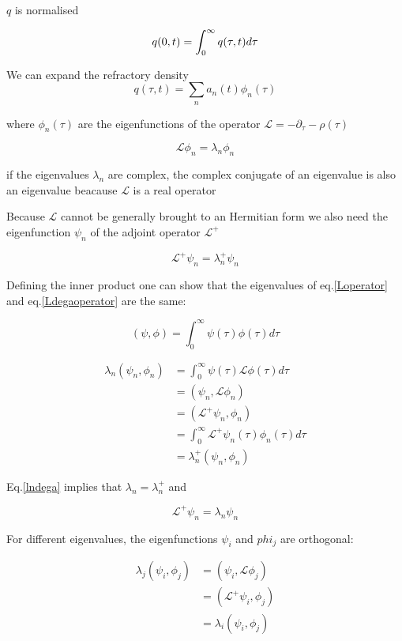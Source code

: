 \documentclass[a4paper,12pt,twoside]{article}
\def \be {\begin{equation}}
\def \ee {\end{equation}}
\begin{document}
$q$ is normalised 

\be
\label{nomalisation}
q(0,t)=\int_{0}^{\infty}q(\tau,t)d\tau \\
\ee


We can expand the refractory density
\be
\label{refractoryexpansion}
q(\tau,t)=\sum_n a_n(t)\phi_n(\tau)
\ee

where $\phi_n(\tau)$ are the eigenfunctions of the operator $\mathcal{L}=-\partial_{\tau}-\rho(\tau)$


\be
\label{Loperator}
\mathcal{L}\phi_n=\lambda_n\phi_n
\ee

if the eigenvalues $\lambda_n$ are complex, the complex conjugate of an eigenvalue is also an eigenvalue beacause $\mathcal{L}$ is a real operator

Because $\mathcal{L}$ cannot be generally brought to an Hermitian form we also need  the eigenfunction $\psi_n$ of the adjoint operator  $\mathcal{L}^{+}$

\be
\label{Ldegaoperator}
\mathcal{L}^+\psi_n=\lambda_n^+\psi_n
\ee

Defining the inner product one can show that the eigenvalues of eq.\eqref{Loperator} and eq.\eqref{Ldegaoperator} are the same:

\be
(\psi,\phi)=\int_{0}^{\infty}\psi(\tau)\phi(\tau)d\tau
\ee

\begin{align}
\lambda_n(\psi_n,\phi_n) &=\int_{0}^{\infty}\psi(\tau)\mathcal{L}\phi(\tau)d\tau  \nonumber \\
&=(\psi_n,\mathcal{L}\phi_n)  \nonumber \\
&=(\mathcal{L}^+\psi_n,\phi_n)  \nonumber \\
&=\int_{0}^{\infty}\mathcal{L}^+\psi_n(\tau)\phi_n(\tau)d\tau  \nonumber \\
&=\lambda_n^+(\psi_n,\phi_n) \label{lndega}
\end{align}

Eq.\eqref{lndega} implies that $\lambda_n=\lambda_n^+$ and
	
\be
\label{Ldegaoperator2}
\mathcal{L}^+\psi_n=\lambda_n\psi_n
\ee

For different eigenvalues, the eigenfunctions $\psi_i$ and $phi_j$ are orthogonal:

\begin{align}
\lambda_j(\psi_i,\phi_j) 
&=(\psi_i,\mathcal{L}\phi_j) \nonumber \\
&=(\mathcal{L}^+\psi_i,\phi_j)  \nonumber \\
&=\lambda_i(\psi_i,\phi_j) \label{lorthogonal}
\end{align}
\end{document}

